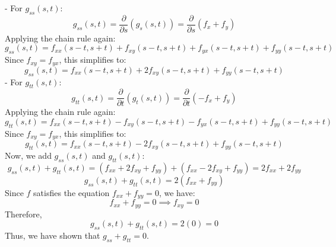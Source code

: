 \documentclass[reqno, 12pt]{amsart}
\begin{document}
\begin{itemize}
\begin{answerbox}
        - For $g_{ss}(s,t)$:
            \[
            g_{ss}(s,t) = \frac{\partial}{\partial s} (g_s(s,t)) = \frac{\partial}{\partial s} (f_x + f_y)
            \]
            Applying the chain rule again:
            \[
            g_{ss}(s,t) = f_{xx}(s-t, s+t) + f_{xy}(s-t, s+t) + f_{yx}(s-t, s+t) + f_{yy}(s-t, s+t)
            \]
            Since $f_{xy} = f_{yx}$, this simplifies to:
            \[
            g_{ss}(s,t) = f_{xx}(s-t, s+t) + 2f_{xy}(s-t, s+t) + f_{yy}(s-t, s+t)
            \]
        - For $g_{tt}(s,t)$:
            \[
            g_{tt}(s,t) = \frac{\partial}{\partial t} (g_t(s,t)) = \frac{\partial}{\partial t} (-f_x + f_y)
            \]
            Applying the chain rule again:
            \[
            g_{tt}(s,t) = f_{xx}(s-t, s+t) - f_{xy}(s-t, s+t) - f_{yx}(s-t, s+t) + f_{yy}(s-t, s+t)
            \]
            Since $f_{xy} = f_{yx}$, this simplifies to:
            \[
            g_{tt}(s,t) = f_{xx}(s-t, s+t) - 2f_{xy}(s-t, s+t) + f_{yy}(s-t, s+t)
            \]
        Now, we add $g_{ss}(s,t)$ and $g_{tt}(s,t)$:
        \[
            g_{ss}(s,t) + g_{tt}(s,t) = (f_{xx} + 2f_{xy} + f_{yy}) + (f_{xx} - 2f_{xy} + f_{yy}) = 2f_{xx} + 2f_{yy}
        \]
        \[
            g_{ss}(s,t) + g_{tt}(s,t) = 2(f_{xx} + f_{yy})
        \]
        Since $f$ satisfies the equation $f_{xx} + f_{yy} = 0$, we have:
        \[
            f_{xx} + f_{yy} = 0 \implies f_{xy} = 0
        \]
        Therefore,
        \[
            g_{ss}(s,t) + g_{tt}(s,t) = 2(0) = 0
        \]
        Thus, we have shown that $g_{ss} + g_{tt} = 0$.
        \end{answerbox}

\end{itemize}
\end{document}
